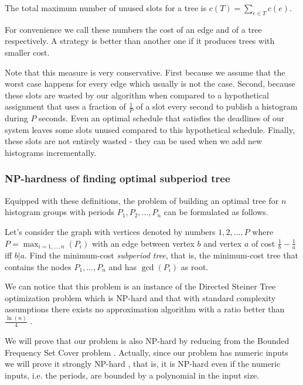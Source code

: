 \begin{definition}
The total maximum number of unused slots for a tree is $c(T)=\sum_{e\in T}c(e)$. 
\end{definition}

For convenience we call these numbers the cost of an edge and of a tree respectively. A strategy is better than another one if it produces trees with smaller cost. 

Note that this measure is very conservative. First because we assume that the worst case happens for every edge which usually is not the case. Second, because these slots are wasted by our algorithm when compared to a hypothetical assignment that uses a fraction of $\frac 1 P$ of a slot every second to publish a histogram during $P$ seconds. Even an optimal schedule that satisfies the deadlines of our system leaves some slots unused compared to this hypothetical schedule. Finally, these slots are not entirely wasted - they can be used when we add new histograms incrementally.

\subsubsection*{NP-hardness of finding optimal subperiod tree}

Equipped with these definitions, the problem of building an optimal tree for $n$ histogram groups with periods $P_1, P_2, \ldots,P_n$ can be formulated as follows. 

\begin{problem}
Let's consider the graph with vertices denoted by numbers $1,2,\ldots ,P$ where $P=\max_{i=1,\ldots,n}(P_i)$ with an edge between vertex $b$ and vertex $a$ of cost $\frac 1 b -\frac 1 a$ iff $b \vert a$. Find the minimum-cost \emph{subperiod tree}, that is, the minimum-cost tree that contains the nodes $P_1,\ldots,P_n$ and has $\gcd(P_i)$ as root.
\end{problem}

We can notice that this problem is an instance of the Directed Steiner Tree optimization problem which is NP-hard and that with standard complexity assumptions there exists no approximation algorithm with a ratio better than $\frac {\ln (n)} 4$ \citep{zelikovsky1997series, ming2006fasterdsp}.

We will prove that our problem is also NP-hard by reducing from the Bounded Frequency Set Cover problem \citep{gary1979computers, cmulecture}. Actually, since our problem has numeric inputs we will prove it strongly NP-hard \citep{garey1978strong}, that is, it is NP-hard even if the numeric inputs, i.e. the periods, are bounded by a polynomial in the input size.

